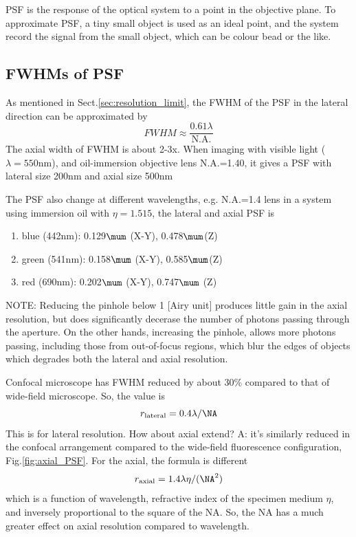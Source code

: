 PSF is the response of the optical system to a point in the objective plane. To
approximate PSF, a tiny small object is used as an ideal point, and the system
record the signal from the small object, which can be colour bead or the like.

\subsection{FWHMs of PSF}

As mentioned in Sect.\ref{sec:resolution_limit}, the FWHM of the PSF in the
lateral direction can be approximated by
\begin{equation}
FWHM \approx \frac{0.61\lambda}{\text{N.A.}}
\end{equation}
The axial width of FWHM is about 2-3x. When imaging with visible light
($\lambda=550$nm), and oil-immersion objective lens N.A.=1.40, it gives a PSF
with lateral size 200nm and axial size 500nm

The PSF also change at different wavelengths, e.g. N.A.=1.4 lens
in a system using immersion oil with $\eta=1.515$, the lateral and axial PSF is
\begin{enumerate}
  \item blue (442nm): 0.129$\mum$ (X-Y), 0.478$\mum$(Z)
  \item green (541nm): 0.158$\mum$ (X-Y), 0.585$\mum$(Z)
  \item red (690nm): 0.202$\mum$ (X-Y), 0.747$\mum$ (Z)
\end{enumerate}
NOTE: Reducing the pinhole below 1 [Airy unit] produces little gain in the axial
resolution, but does significantly decerase the number of photons passing
through the aperture. On the other hands, increasing the pinhole, allows more
photons passing, including those from out-of-focus regions, which blur the edges
of objects which degrades both the lateral and axial resolution.


\begin{framed}
Confocal microscope has FWHM reduced by about 30\% compared to that of wide-field
microscope. So, the value is 
\begin{equation}
r_\text{lateral} = 0.4\lambda/\NA
\end{equation}
This is for lateral resolution. How about axial extend? A: it's similarly
reduced in the confocal arrangement compared to the wide-field fluorescence
configuration, Fig.\ref{fig:axial_PSF}. For the axial, the formula is different
\begin{equation}
r_\text{axial} = 1.4\lambda\eta/(\NA^2)
\end{equation}
which is a function of wavelength, refractive index of the specimen medium
$\eta$, and inversely proportional to the square of the NA. So, the NA has a
much greater effect on axial resolution compared to wavelength. 

\end{framed}

